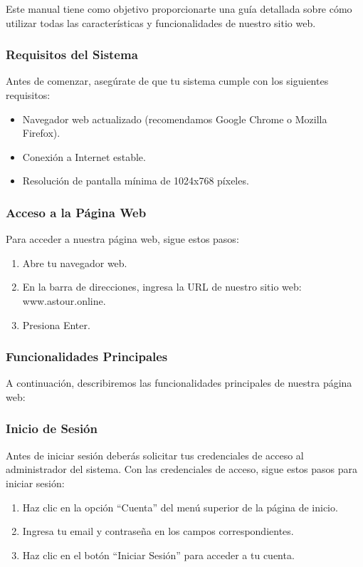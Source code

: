 Este manual tiene como objetivo proporcionarte una guía detallada sobre cómo utilizar todas las características y funcionalidades de nuestro sitio web.

\subsubsection{Requisitos del Sistema}
Antes de comenzar, asegúrate de que tu sistema cumple con los siguientes requisitos:

\begin{itemize}
	\item Navegador web actualizado (recomendamos Google Chrome o Mozilla Firefox).
	\item Conexión a Internet estable.
	\item Resolución de pantalla mínima de 1024x768 píxeles.
\end{itemize}

\subsubsection{Acceso a la Página Web}
Para acceder a nuestra página web, sigue estos pasos:

\begin{enumerate}
	\item Abre tu navegador web.
	\item En la barra de direcciones, ingresa la URL de nuestro sitio web: www.astour.online.
	\item Presiona Enter.
\end{enumerate}

\subsubsection{Funcionalidades Principales}
A continuación, describiremos las funcionalidades principales de nuestra página web:

\subsubsection{Inicio de Sesión}
Antes de iniciar sesión deberás solicitar tus credenciales de acceso al administrador del sistema.
Con las credenciales de acceso, sigue estos pasos para iniciar sesión:

\begin{enumerate}
	\item Haz clic en la opción “Cuenta” del menú superior de la página de inicio.
	\item Ingresa tu email y contraseña en los campos correspondientes.
	\item Haz clic en el botón “Iniciar Sesión” para acceder a tu cuenta.
\end{enumerate}

